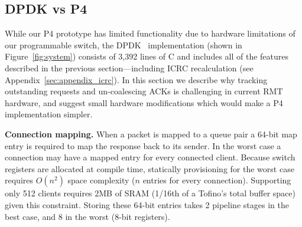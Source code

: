 

\subsection{DPDK vs P4}

While our P4 prototype has limited functionality due to hardware
limitations of our programmable switch, the DPDK
\sword\ implementation (shown in Figure~\ref{fig:system}) consists of
3,392 lines of C and includes all of the features described in the
previous section---including ICRC recalculation (see
Appendix~\ref{sec:appendix_icrc}).  In this section we describe why
tracking outstanding requests and un-coalescing ACKs is challenging in
current RMT hardware, and suggest small hardware modifications which
would make a P4 implementation simpler.


\textbf{Connection mapping.} When a packet is mapped to a queue pair a
64-bit map entry is required to map the response back to its
sender. In the worst case a connection may have a mapped entry for
every connected client. Because switch registers are allocated at
compile time, statically provisioning for the worst case requires
$O(n^2)$ space complexity ($n$ entries for every connection).
Supporting only 512 clients requires 2MB of SRAM (1/16th of a Tofino's
total buffer space) given this constraint. Storing these 64-bit
entries takes 2 pipeline stages in the best case, and 8 in the worst
(8-bit registers).

